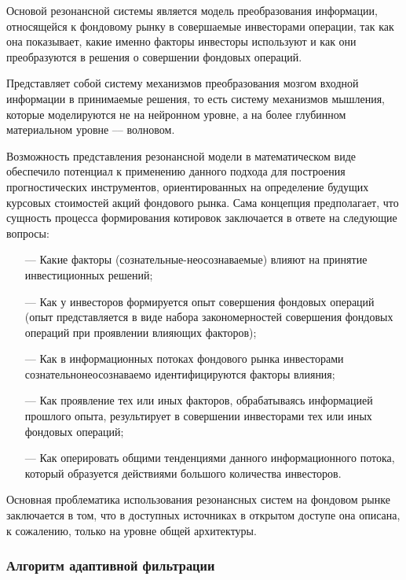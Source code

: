 \par Основой резонансной системы является модель преобразования
информации, относящейся к фондовому рынку в совершаемые инвесторами операции, так
как она показывает, какие именно факторы инвесторы используют и как они
преобразуются в решения о совершении фондовых операций.

\par Представляет собой систему механизмов преобразования
мозгом входной информации в принимаемые решения, то есть систему механизмов
мышления, которые моделируются не на нейронном уровне, а на более глубинном
материальном уровне –-- волновом.\cite{stock-AI}

\par Возможность представления резонансной модели в математическом виде обеспечило потенциал к
применению данного подхода для построения прогностических инструментов,
ориентированных на определение будущих курсовых стоимостей акций фондового рынка. Сама концепция
предполагает, что сущность процесса формирования котировок заключается в ответе на следующие вопросы:

\begin{itemize}[leftmargin=1.6\parindent]
	\item[---] Какие факторы (сознательные-неосознаваемые) влияют на принятие инвестиционных
решений;
	\item[---] Как у инвесторов формируется опыт совершения фондовых операций (опыт
представляется в виде набора закономерностей совершения фондовых операций при
проявлении влияющих факторов);
	\item[---] Как в информационных потоках фондового рынка инвесторами сознательнонеосознаваемо идентифицируются факторы влияния;
	\item[---] Как проявление тех или иных факторов, обрабатываясь информацией прошлого опыта,
результирует в совершении инвесторами тех или иных фондовых операций;
	\item[---] Как оперировать общими тенденциями данного информационного потока, который
образуется действиями большого количества инвесторов.
\end{itemize}

\par Основная проблематика использования резонансных систем на фондовом рынке заключается в том, что в доступных источниках в открытом доступе она описана, к сожалению, только на уровне общей архитектуры. 
\subsubsection{Алгоритм адаптивной фильтрации}

